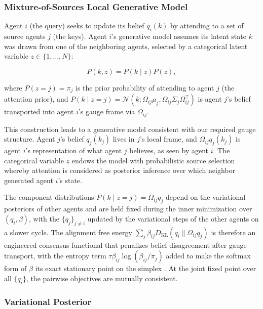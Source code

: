 \documentclass[twoside,11pt]{article}
\begin{document}
\subsubsection{Mixture-of-Sources Local Generative Model}

Agent $i$ (the query) seeks to update its belief $q_i(k)$ by attending to a set of source agents $j$ (the keys). Agent $i$'s generative model assumes its latent state $k$ was drawn from one of the neighboring agents, selected by a categorical latent variable $z \in \{1, \ldots, N\}$:

\begin{equation}
P(k, z) = P(k \mid z) P(z),
\label{eq:mixture_joint}
\end{equation}

where $P(z = j) = \pi_j$ is the prior probability of attending to agent $j$ (the attention prior), and $P(k \mid z = j) = \mathcal{N}(k; \Omega_{ij}\mu_j, \Omega_{ij}\Sigma_j\Omega_{ij}^\top)$ is agent $j$'s belief transported into agent $i$'s gauge frame via $\Omega_{ij}$.

This construction leads to a generative model consistent with our required gauge structure. Agent $j$'s belief $q_j(k_j)$ lives in $j$'s local frame, and $\Omega_{ij}q_j(k_j)$ is agent $i$'s representation of what agent $j$ believes, as seen by agent $i$. The categorical variable $z$ endows the model with probabilistic source selection whereby attention is considered as posterior inference over which neighbor generated agent $i$'s state.

The component distributions $P(k \mid z{=}j) = \Omega_{ij}q_j$ depend on the variational posteriors of other agents and are held fixed during the inner minimization over $(q_i, \beta)$, with the $\{q_j\}_{j\neq i}$ updated by the variational steps of the other agents on a slower cycle. The alignment free energy $\sum_j \beta_{ij} D_{\mathrm{KL}}(q_i \| \Omega_{ij}q_j)$ is therefore an engineered consensus functional that penalizes belief disagreement after gauge transport, with the entropy term $\tau \beta_{ij}\log(\beta_{ij}/\pi_j)$ added to make the softmax form of $\beta$ its exact stationary point on the simplex \citep{Cuturi2013, Boyd2004}. At the joint fixed point over all $\{q_i\}$, the pairwise objectives are mutually consistent.

\subsubsection{Variational Posterior}
\end{document}
